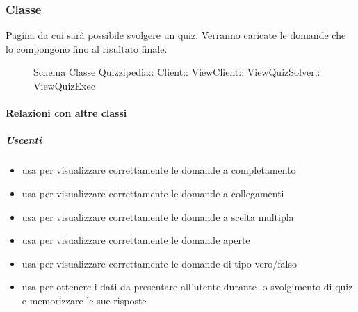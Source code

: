 \subsubsection{Classe }
Pagina da cui sarà possibile svolgere un quiz. Verranno caricate le domande che lo compongono fino al risultato finale.
\begin{figure}[H]
\centering
\noindent{}
\caption[Schema Classe ViewQuizExec]{Schema Classe Quizzipedia:: Client:: ViewClient:: ViewQuizSolver:: ViewQuizExec}
\end{figure}
\paragraph{Relazioni con altre classi}
\subparagraph{Uscenti}
\begin{itemize}
\item usa  per visualizzare correttamente le domande a completamento
\item usa  per visualizzare correttamente le domande a collegamenti
\item usa  per visualizzare correttamente le domande a scelta multipla
\item usa  per visualizzare correttamente le domande aperte
\item usa  per visualizzare correttamente le domande di tipo vero/falso
\item usa  per ottenere i dati da presentare all'utente durante lo svolgimento di quiz e memorizzare le sue risposte
\end{itemize}
